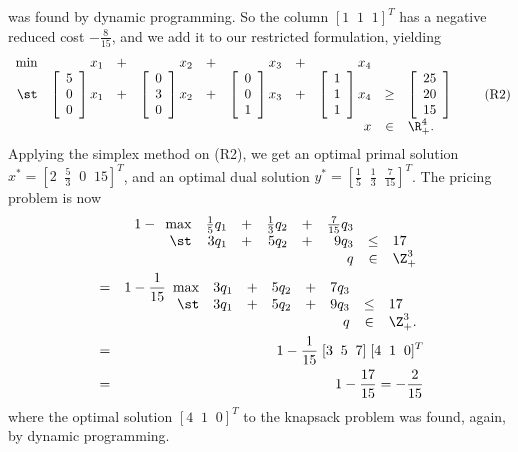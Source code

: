 was found by dynamic programming.
So the column $[ 1 \;\; 1 \;\; 1 ]^T$ has a negative reduced cost
$- \frac{8}{15}$, and we add it to our restricted formulation, yielding
\[
\begin{array}{rrcrcrcrcl}
\min & x_1 & + & x_2 & + & x_3 & + & x_4 & & \\
\st &
	\vvec{5 \\ 0 \\ 0} x_1 & + &
	\vvec{0 \\ 3 \\ 0} x_2 & + &
	\vvec{0 \\ 0 \\ 1} x_3 & + &
	\vvec{1 \\ 1 \\ 1} x_4 & \geq &
	\vvec{25 \\ 20 \\ 15} \\
 & & & & & & & x & \in & \R^4_+.
\end{array}
\tag{R2}
\]
Applying the simplex method on (R2), we get an optimal primal solution
$x^* = [ 2 \;\; \frac{5}{3} \;\; 0 \;\; 15 ]^T$, and an optimal dual
solution $y^* = [ \frac{1}{5} \;\; \frac{1}{3} \;\; \frac{7}{15} ]^T$.
The pricing problem is now
\begin{eqnarray*}
&   & 1 - \begin{array}[t]{rrcrcrcl}
	\max & \frac{1}{5} q_1 & + & \frac{1}{3} q_2 & + & \frac{7}{15} q_3 & & \\
	\st  &           3 q_1 & + &           5 q_2 & + &            9 q_3 & \leq & 17 \\
	     &                 &   &                 &   &              q   & \in  & \Z^3_+
	\end{array} \\
& = & 1 - \frac{1}{15} \begin{array}[t]{rrcrcrcl}
	\max &           3 q_1 & + &           5 q_2 & + &  7 q_3 & & \\
	\st  &           3 q_1 & + &           5 q_2 & + &  9 q_3 & \leq & 17 \\
	     &                 &   &                 &   &    q   & \in  & \Z^3_+.
	\end{array} \\
& = & 1 - \frac{1}{15} \; [ 3 \;\; 5 \;\; 7 ] \; [ 4 \;\; 1 \;\; 0 ]^T \\
& = & 1 - \frac{17}{15} = - \frac{2}{15}
\end{eqnarray*}
where the optimal solution $[ 4 \;\; 1 \;\; 0 ]^T$ to the knapsack problem
was found, again, by dynamic programming.
